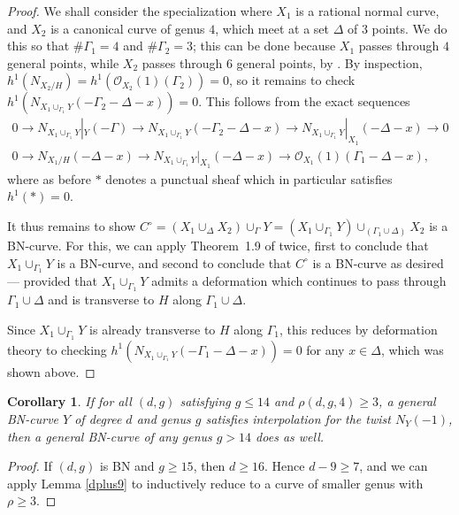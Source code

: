 \documentclass[11pt]{amsart}
\renewcommand{\O}{\mathcal{O}}
\newtheorem{cor}[thm]{Corollary}
\theoremstyle{definition}
\theoremstyle{remark}
\begin{document}
\begin{proof}
We shall consider the specialization
where $X_1$ is a rational normal curve,
and $X_2$ is a canonical curve of genus $4$, which meet at a set $\Delta$
of $3$ points. We do this so that $\# \Gamma_1 = 4$ and $\# \Gamma_2 = 3$;
this can be done because
$X_1$ passes through $4$ general points, while $X_2$ passes through
$6$ general points, by \cite[Corollary 1.4]{joint}.
By inspection, $h^1(N_{X_2 / H}) = h^1(\O_{X_2}(1)(\Gamma_2)) = 0$,
so it remains to check
$h^1(N_{X_1 \cup_{\Gamma_1} Y} (-\Gamma_2 - \Delta - x)) = 0$.
This follows from the exact sequences
\begin{gather*}
0 \to N_{X_1 \cup_{\Gamma_1} Y}|_Y(-\Gamma) \to N_{X_1 \cup_{\Gamma_1} Y} (-\Gamma_2 - \Delta - x) \to  N_{X_1 \cup_{\Gamma_1} Y}|_{X_1}(-\Delta - x) \to 0 \\
0 \to N_{X_1 / H}(-\Delta - x) \to N_{X_1 \cup_{\Gamma_1} Y}|_{X_1}(-\Delta - x) \to \O_{X_1}(1)(\Gamma_1 - \Delta - x),
\end{gather*}
where as before $*$ denotes a punctual sheaf which in particular satisfies $h^1(*) = 0$.

It thus remains to show $C^\circ = (X_1 \cup_\Delta X_2) \cup_\Gamma Y = (X_1 \cup_{\Gamma_1} Y) \cup_{(\Gamma_1 \cup \Delta)} X_2$ is a BN-curve.
For this, we can apply Theorem~1.9 of \cite{rbn} twice,
first to conclude that $X_1 \cup_{\Gamma_1} Y$
is a BN-curve, and second to conclude that $C^\circ$ is a BN-curve
as desired --- provided that $X_1 \cup_{\Gamma_1} Y$ admits
a deformation which continues to pass through $\Gamma_1 \cup \Delta$
and is transverse to $H$ along $\Gamma_1 \cup \Delta$.

Since $X_1 \cup_{\Gamma_1} Y$ is already transverse to $H$ along $\Gamma_1$,
this reduces by deformation theory to checking
$h^1(N_{X_1 \cup_{\Gamma_1} Y}(-\Gamma_1 - \Delta - x)) = 0$
for any $x \in \Delta$, which was shown above.
\end{proof}


\begin{cor}\label{gleq14}
If for all $(d,g)$ satisfying $g\leq 14$ and $\rho(d,g,4) \geq 3$, a general BN-curve $Y$ of degree $d$ and genus $g$ satisfies interpolation for the twist $N_Y(-1)$, then a general BN-curve of any genus $g > 14$ does as well.
\end{cor}
\begin{proof}
If $(d,g)$ is BN and $g \geq 15$, then $d \geq 16$.  Hence $d-9 \geq 7$, and we can apply Lemma \ref{dplus9} to inductively reduce to a curve of smaller genus with $\rho \geq 3$.
\end{proof}
\end{document}
